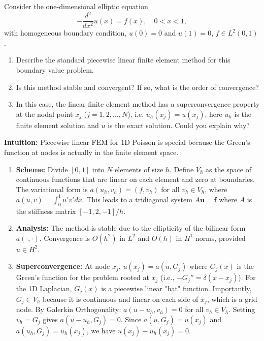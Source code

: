 \begin{exercise}
\label{applied:2012:6}
Consider the one-dimensional elliptic equation
\[
-\frac{d^{2}}{dx^{2}}u(x)=f(x),\quad 0<x<1,
\]
with homogeneous boundary condition, $u(0)=0$ and $u(1)=0$, $f\in L^{2}(0,1)$.
\begin{enumerate}
    \item[(i)] Describe the standard piecewise linear finite element method for this boundary value problem.
    \item[(ii)] Is this method stable and convergent? If so, what is the order of convergence?
    \item[(iii)] In this case, the linear finite element method has a superconvergence property at the nodal point $x_{j}$ ($j=1,2,\ldots,N$), i.e. $u_{h}(x_{j})=u(x_{j})$, here $u_{h}$ is the finite element solution and $u$ is the exact solution. Could you explain why?
\end{enumerate}
\end{exercise}

\begin{solution}
\textbf{Intuition:} Piecewise linear FEM for 1D Poisson is special because the Green's function at nodes is actually in the finite element space.

\begin{enumerate}
    \item[(i)] \textbf{Scheme:} Divide $[0,1]$ into $N$ elements of size $h$. Define $V_h$ as the space of continuous functions that are linear on each element and zero at boundaries. The variational form is $a(u_h, v_h) = (f, v_h)$ for all $v_h \in V_h$, where $a(u,v) = \int_0^1 u' v' dx$. This leads to a tridiagonal system $A \mathbf{u} = \mathbf{f}$ where $A$ is the stiffness matrix $[-1, 2, -1]/h$.
    \item[(ii)] \textbf{Analysis:} The method is stable due to the ellipticity of the bilinear form $a(\cdot, \cdot)$. Convergence is $O(h^2)$ in $L^2$ and $O(h)$ in $H^1$ norms, provided $u \in H^2$.
    \item[(iii)] \textbf{Superconvergence:}
    At node $x_j$, $u(x_j) = a(u, G_j)$ where $G_j(x)$ is the Green's function for the problem rooted at $x_j$ (i.e., $-G_j'' = \delta(x-x_j)$).
    For the 1D Laplacian, $G_j(x)$ is a piecewise linear "hat" function.
    Importantly, $G_j \in V_h$ because it is continuous and linear on each side of $x_j$, which is a grid node.
    By Galerkin Orthogonality: $a(u-u_h, v_h) = 0$ for all $v_h \in V_h$.
    Setting $v_h = G_j$ gives $a(u-u_h, G_j) = 0$.
    Since $a(u, G_j) = u(x_j)$ and $a(u_h, G_j) = u_h(x_j)$, we have $u(x_j) - u_h(x_j) = 0$.
\end{enumerate}
\end{solution}

